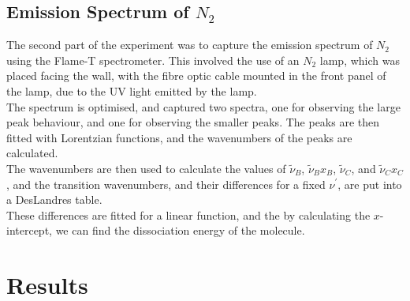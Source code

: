 \documentclass{article}
\begin{document}
\subsection{Emission Spectrum of $N_2$}
The second part of the experiment was to capture the emission spectrum of $N_2$ using the Flame-T spectrometer. This involved the use of an $N_2$ lamp, which was placed facing the wall, with the fibre optic cable mounted in the front panel of the lamp, due to the UV light emitted by the lamp.\\
\indent The spectrum is optimised, and captured two spectra, one for observing the large peak behaviour, and one for observing the smaller peaks. The peaks are then fitted with Lorentzian functions, and the wavenumbers of the peaks are calculated.\\
\indent The wavenumbers are then used to calculate the values of $\tilde{\nu}_B$, $\tilde{\nu}_Bx_B$, $\tilde{\nu}_C$, and $\tilde{\nu}_Cx_C$, and the transition wavenumbers, and their differences for a fixed $\nu^{\prime}$, are put into a DesLandres table.\\
\indent These differences are fitted for a linear function, and the by calculating the $x$-intercept, we can find the dissociation energy of the molecule.\\
\section{Results}
\end{document}
